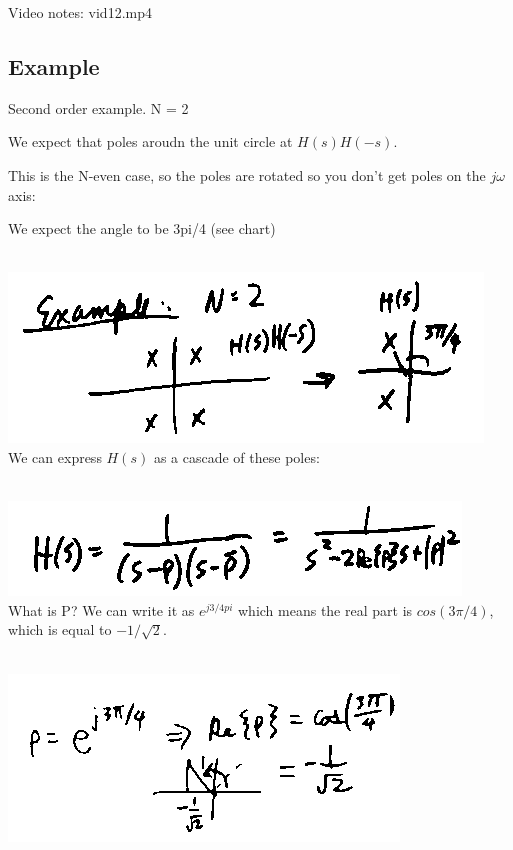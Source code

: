 Video notes: vid12.mp4

\subsection*{Example}
Second order example.  N = 2

We expect that poles aroudn the unit circle at $H(s)H(-s)$.

This is the N-even case, so the poles are rotated so you don't get 
poles on the $j\omega$ axis:

We expect the angle to be 3pi/4 (see chart)

\\
\includegraphics[scale=0.5]{frames/17a}\\

We can express $H(s)$ as a cascade of these poles:


\\
\includegraphics[scale=0.5]{frames/17b}\\

What is P? We can write it as $e^{j3/4pi}$ which means the real part is
$cos(3\pi/4)$, which is equal to $-1/\sqrt{2}$. 

\\
\includegraphics[scale=0.5]{frames/17c}\\

